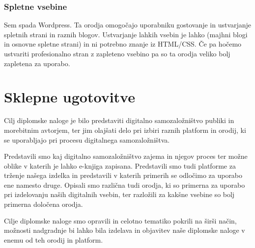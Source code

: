 \documentclass[a4paper, 12pt]{book}
\begin{document}
\subsection{Spletne vsebine}
Sem spada Wordpress. Ta orodja omogočajo uporabniku gostovanje in ustvarjanje spletnih strani in raznih blogov. Ustvarjanje lahkih vsebin je lahko (majhni blogi in osnovne spletne strani) in ni potrebno znanje iz HTML/CSS. Če pa hočemo ustvariti profesionalno stran z zapleteno vsebino pa so ta orodja veliko bolj zapletena za uporabo. 

\chapter{Sklepne ugotovitve}
\label{zakljucek}
Cilj diplomske naloge je bilo predstaviti digitalno samozaložništvo publiki in morebitnim avtorjem, ter jim olajšati delo pri izbiri raznih platform in orodij, ki se uporabljajo pri procesu digitalnega samozaložništva. 

Predstavili smo kaj digitalno samozaložništvo zajema in njegov proces ter možne oblike v katerih je lahko e-knjiga zapisana. Predstavili smo tudi platforme za trženje našega izdelka in predstavili v katerih primerih se odločimo za uporabo ene namesto druge. Opisali smo različna tudi orodja, ki so primerna za uporabo pri izdelovanju naših digitalnih vsebin, ter razložili za kakšne vsebine so bolj primerna določena orodja.

Cilje diplomske naloge smo opravili in celotno tematiko pokrili na širši način, možnosti nadgradnje bi lahko bila izdelava in objavitev naše diplomske naloge v enemu od teh orodij in platform. 
\end{document}
